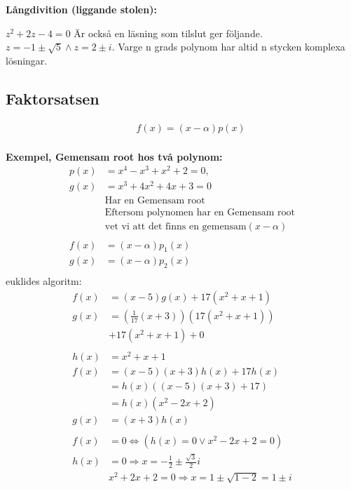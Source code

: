 \begin{multicols}{2}
\textbf{Långdivition (liggande stolen):}\par
{}
$z^2 + 2z - 4 = 0$ Är också en läsning som tilslut ger följande.
$z = -1 \pm \sqrt{5} \land z = 2 \pm i$.
Varge n grads polynom har altid n stycken komplexa lösningar.


\subsection{Faktorsatsen}
\begin{align*} 
  &\quad  f(x) = (x - \alpha)p(x) \\
\end{align*}

\textbf{Exempel, Gemensam root hos två polynom:}
\begin{align*}
  p(x)&=x^4-x^3+x^2+2=0, \\
  g(x)&=x^3+4x^2+4x+3=0 \\
  &\text{Har en Gemensam root} \\
  &\text{Eftersom polynomen har en Gemensam root} \\
  &\text{vet vi att det finns en gemensam} (x-\alpha) \\
  &\\
  f(x)&=(x-\alpha)p_1(x) \\  
  g(x)&=(x-\alpha)p_2(x) \\  
\end{align*}
euklides algoritm:
\begin{align*}
  f(x)&=(x-5)g(x)+17(x^2+x+1) \\
  g(x)&=(\frac{1}{17}(x+3))(17(x^2+x+1)) \\
  &+17(x^2+x+1) + 0 \\
  &\\
  h(x)&=x^2+x+1 \\
  f(x)&= (x-5)(x+3)h(x)+17h(x) \\
  &= h(x)((x-5)(x+3)+17) \\
  &= h(x)(x^2-2x+2) \\
  g(x)&= (x+3)h(x) \\ 
  &\\
  f(x)&=0 \Leftrightarrow (h(x)=0 \lor x^2-2x+2=0) \\
  h(x)&=0 \Rightarrow x=-\frac{1}{2} \pm \frac{\sqrt{3}}{2}i \\
  &x^2+2x+2=0 \Rightarrow x=1 \pm \sqrt{1-2}=1 \pm i \\
\end{align*}


\end{multicols}
